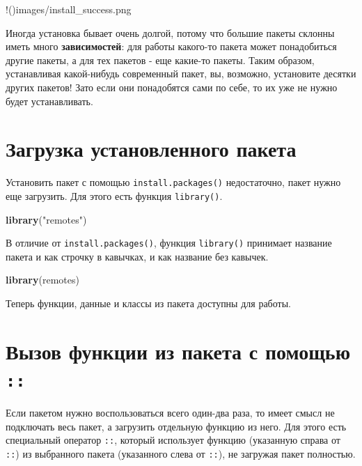 \documentclass[]{book}
\newenvironment{Shaded}{\begin{snugshade}}{\end{snugshade}}
\newcommand{\KeywordTok}[1]{\textcolor[rgb]{0.13,0.29,0.53}{\textbf{#1}}}
\newcommand{\StringTok}[1]{\textcolor[rgb]{0.31,0.60,0.02}{#1}}
\newcommand{\NormalTok}[1]{#1}
\begin{document}
!(){images/install\_success.png}

Иногда установка бывает очень долгой, потому что большие пакеты склонны
иметь много \textbf{зависимостей}: для работы какого-то пакета может
понадобиться другие пакеты, а для тех пакетов - еще какие-то пакеты.
Таким образом, устанавливая какой-нибудь современный пакет, вы,
возможно, установите десятки других пакетов! Зато если они понадобятся
сами по себе, то их уже не нужно будет устанавливать.

\section{Загрузка установленного пакета}\label{package_load}

Установить пакет с помощью \texttt{install.packages()} недостаточно,
пакет нужно еще загрузить. Для этого есть функция \texttt{library()}.

\begin{Shaded}
\begin{Highlighting}[]
\KeywordTok{library}\NormalTok{(}\StringTok{"remotes"}\NormalTok{)}
\end{Highlighting}
\end{Shaded}

В отличие от \texttt{install.packages()}, функция \texttt{library()}
принимает название пакета и как строчку в кавычках, и как название без
кавычек.

\begin{Shaded}
\begin{Highlighting}[]
\KeywordTok{library}\NormalTok{(remotes)}
\end{Highlighting}
\end{Shaded}

Теперь функции, данные и классы из пакета доступны для работы.

\section{\texorpdfstring{Вызов функции из пакета с помощью
\texttt{::}}{Вызов функции из пакета с помощью ::}}\label{from_package}

Если пакетом нужно воспользоваться всего один-два раза, то имеет смысл
не подключать весь пакет, а загрузить отдельную функцию из него. Для
этого есть специальный оператор \texttt{::}, который использует функцию
(указанную справа от \texttt{::}) из выбранного пакета (указанного слева
от \texttt{::}), не загружая пакет полностью.
\end{document}
